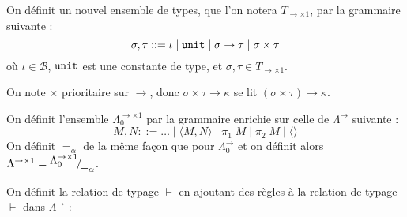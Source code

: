 \begin{defi}
    On définit un nouvel ensemble de types, que l'on notera $T_{\to\times 1}$, par la grammaire suivante :
    $$\sigma,\tau ::= \iota\mid \unit\mid \sigma\to\tau\mid \sigma \times \tau$$ où $\iota\in\mathcal B$, $\unit$ est une constante de type, et $\sigma,\tau\in T_{\to\times 1}$.
\end{defi}

\begin{rmk}
    On note $\times$ prioritaire sur $\to$, donc $\sigma\times\tau\to\kappa$ se lit $(\sigma\times\tau)\to\kappa$.
\end{rmk}

\begin{defi}
    On définit l'ensemble $\Lambda_0^{\to\times 1}$ par la grammaire enrichie sur celle de $\Lambda^{\to}$ suivante :
    $$M,N ::= \ldots \mid \langle M,N\rangle \mid \pi_1\;M\mid \pi_2\;M\mid \langle\rangle$$ On définit $=_\alpha$ de la même façon que pour $\Lambda_0^{\to}$ et on définit alors $\Lambda^{\to\times 1} = \quot{\Lambda_0^{\to\times 1}}{=_\alpha}$.
\end{defi}

\begin{defi}
    On définit la relation de typage $\vdash$ en ajoutant des règles à la relation de typage $\vdash$ dans $\Lambda^{\to}$ :
    \begin{center}
        \begin{prooftree}
        \end{prooftree}
        \qquad
        \begin{prooftree}
        \end{prooftree}
        \qquad
        \begin{prooftree}
        \end{prooftree}

        \vspace{0.5cm}

        \begin{prooftree}
        \end{prooftree}
    \end{center}
\end{defi}

